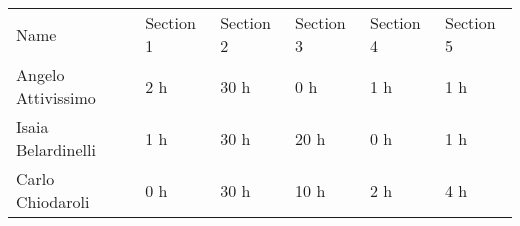 \begin{center}
    \begin{tabu}{|X[1.5]|X|X|X|X|X|} \hline \everyrow{\hline}
        Name & Section 1 & Section 2 & Section 3 & Section 4 & Section 5\\ 
        Angelo Attivissimo & 2 h &  30 h & 0 h & 1 h & 1 h\\
        Isaia Belardinelli & 1 h & 30 h & 20 h & 0 h & 1 h\\
        Carlo Chiodaroli & 0 h & 30 h & 10 h & 2 h & 4 h\\ 
    \end{tabu}
\end{center}